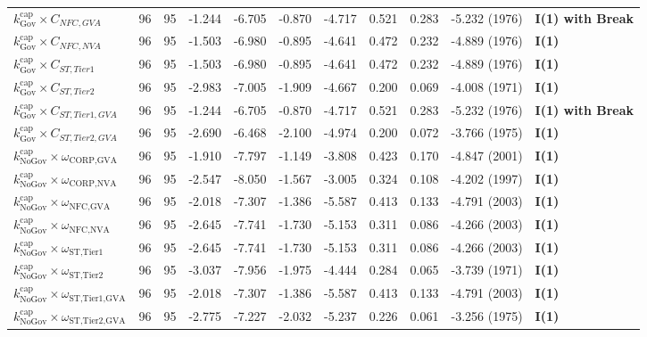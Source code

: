 \begin{table}[H]
\begin{tabular}{p{5.5cm} p{0.5cm} p{0.5cm} p{1.3cm} p{1.3cm} p{1.3cm} p{1.3cm} p{1.3cm} p{1.3cm} p{2.2cm} p{2.2cm}}
$k^{\text{cap}}_{\text{Gov}} \times C_{NFC,GVA}$ & 96 & 95 & -1.244 & -6.705 & -0.870 & -4.717 & 0.521 & 0.283 & -5.232 (1976) & \textbf{I(1) with Break} \\ 
$k^{\text{cap}}_{\text{Gov}} \times C_{NFC,NVA}$ & 96 & 95 & -1.503 & -6.980 & -0.895 & -4.641 & 0.472 & 0.232 & -4.889 (1976) & \textbf{I(1)} \\ 
$k^{\text{cap}}_{\text{Gov}} \times C_{ST,Tier1}$ & 96 & 95 & -1.503 & -6.980 & -0.895 & -4.641 & 0.472 & 0.232 & -4.889 (1976) & \textbf{I(1)} \\ 
$k^{\text{cap}}_{\text{Gov}} \times C_{ST,Tier2}$ & 96 & 95 & -2.983 & -7.005 & -1.909 & -4.667 & 0.200 & 0.069 & -4.008 (1971) & \textbf{I(1)} \\ 
$k^{\text{cap}}_{\text{Gov}} \times C_{ST,Tier1,GVA}$ & 96 & 95 & -1.244 & -6.705 & -0.870 & -4.717 & 0.521 & 0.283 & -5.232 (1976) & \textbf{I(1) with Break} \\ 
$k^{\text{cap}}_{\text{Gov}} \times C_{ST,Tier2,GVA}$ & 96 & 95 & -2.690 & -6.468 & -2.100 & -4.974 & 0.200 & 0.072 & -3.766 (1975) & \textbf{I(1)} \\ 
$k^{\text{cap}}_{\text{NoGov}} \times \omega_{\text{CORP,GVA}}$ & 96 & 95 & -1.910 & -7.797 & -1.149 & -3.808 & 0.423 & 0.170 & -4.847 (2001) & \textbf{I(1)} \\ 
$k^{\text{cap}}_{\text{NoGov}} \times \omega_{\text{CORP,NVA}}$ & 96 & 95 & -2.547 & -8.050 & -1.567 & -3.005 & 0.324 & 0.108 & -4.202 (1997) & \textbf{I(1)} \\ 
$k^{\text{cap}}_{\text{NoGov}} \times \omega_{\text{NFC,GVA}}$ & 96 & 95 & -2.018 & -7.307 & -1.386 & -5.587 & 0.413 & 0.133 & -4.791 (2003) & \textbf{I(1)} \\ 
$k^{\text{cap}}_{\text{NoGov}} \times \omega_{\text{NFC,NVA}}$ & 96 & 95 & -2.645 & -7.741 & -1.730 & -5.153 & 0.311 & 0.086 & -4.266 (2003) & \textbf{I(1)} \\ 
$k^{\text{cap}}_{\text{NoGov}} \times \omega_{\text{ST,Tier1}}$ & 96 & 95 & -2.645 & -7.741 & -1.730 & -5.153 & 0.311 & 0.086 & -4.266 (2003) & \textbf{I(1)} \\ 
$k^{\text{cap}}_{\text{NoGov}} \times \omega_{\text{ST,Tier2}}$ & 96 & 95 & -3.037 & -7.956 & -1.975 & -4.444 & 0.284 & 0.065 & -3.739 (1971) & \textbf{I(1)} \\ 
$k^{\text{cap}}_{\text{NoGov}} \times \omega_{\text{ST,Tier1,GVA}}$ & 96 & 95 & -2.018 & -7.307 & -1.386 & -5.587 & 0.413 & 0.133 & -4.791 (2003) & \textbf{I(1)} \\ 
$k^{\text{cap}}_{\text{NoGov}} \times \omega_{\text{ST,Tier2,GVA}}$ & 96 & 95 & -2.775 & -7.227 & -2.032 & -5.237 & 0.226 & 0.061 & -3.256 (1975) & \textbf{I(1)} \\ 

\end{tabular}
\end{table}

